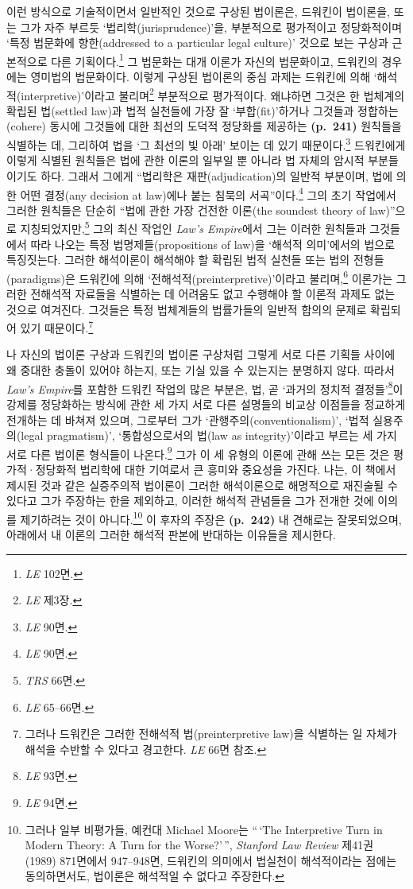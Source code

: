 이런 방식으로 기술적이면서 일반적인 것으로 구상된 법이론은, 드워킨이
법이론을, 또는 그가 자주 부르듯 ‘법리학(jurisprudence)’을, 부분적으로
평가적이고 정당화적이며 ‘특정 법문화에 향한(addressed to a particular
legal culture)’ 것으로 보는 구상과 근본적으로 다른 기획이다.\footnote{\emph{LE}
  102면.} 그 법문화는 대개 이론가 자신의 법문화이고, 드워킨의 경우에는
영미법의 법문화이다. 이렇게 구상된 법이론의 중심 과제는 드워킨에 의해
‘해석적(interpretive)’이라고 불리며\footnote{\emph{LE} 제3장.}
부분적으로 평가적이다. 왜냐하면 그것은 한 법체계의 확립된 법(settled
law)과 법적 실천들에 가장 잘 ‘부합(fit)’하거나 그것들과 정합하는(cohere)
동시에 그것들에 대한 최선의 도덕적 정당화를 제공하는 \textbf{(p.~241)}
원칙들을 식별하는 데, 그리하여 법을 ‘그 최선의 빛 아래’ 보이는 데 있기
때문이다.\footnote{\emph{LE} 90면.} 드워킨에게 이렇게 식별된 원칙들은
법에 관한 이론의 일부일 뿐 아니라 법 자체의 암시적 부분들이기도 하다.
그래서 그에게 “법리학은 재판(adjudication)의 일반적 부분이며, 법에 의한
어떤 결정(any decision at law)에나 붙는 침묵의 서곡”이다.\footnote{\emph{LE}
  90면.} 그의 초기 작업에서 그러한 원칙들은 단순히 “법에 관한 가장
건전한 이론(the soundest theory of law)”으로 지칭되었지만,\footnote{\emph{TRS}
  66면.} 그의 최신 작업인 \emph{Law's Empire}에서 그는 이러한 원칙들과
그것들에서 따라 나오는 특정 법명제들(propositions of law)을 ‘해석적
의미’에서의 법으로 특징짓는다. 그러한 해석이론이 해석해야 할 확립된 법적
실천들 또는 법의 전형들(paradigms)은 드워킨에 의해
‘전해석적(preinterpretive)’이라고 불리며,\footnote{\emph{LE} 65--66면.}
이론가는 그러한 전해석적 자료들을 식별하는 데 어려움도 없고 수행해야 할
이론적 과제도 없는 것으로 여겨진다. 그것들은 특정 법체계들의 법률가들의
일반적 합의의 문제로 확립되어 있기 때문이다.\footnote{그러나 드워킨은
  그러한 전해석적 법(preinterpretive law)을 식별하는 일 자체가 해석을
  수반할 수 있다고 경고한다. \emph{LE} 66면 참조.}

나 자신의 법이론 구상과 드워킨의 법이론 구상처럼 그렇게 서로 다른 기획들
사이에 왜 중대한 충돌이 있어야 하는지, 또는 기실 있을 수 있는지는
분명하지 않다. 따라서 \emph{Law's Empire}를 포함한 드워킨 작업의 많은
부분은, 법, 곧 ‘과거의 정치적 결정들’\footnote{\emph{LE} 93면.}이 강제를
정당화하는 방식에 관한 세 가지 서로 다른 설명들의 비교상 이점들을
정교하게 전개하는 데 바쳐져 있으며, 그로부터 그가
‘관행주의(conventionalism)’, ‘법적 실용주의(legal pragmatism)’,
‘통합성으로서의 법(law as integrity)’이라고 부르는 세 가지 서로 다른
법이론 형식들이 나온다.\footnote{\emph{LE} 94면.} 그가 이 세 유형의
이론에 관해 쓰는 모든 것은 평가적·정당화적 법리학에 대한 기여로서 큰
흥미와 중요성을 가진다. 나는, 이 책에서 제시된 것과 같은 실증주의적
법이론이 그러한 해석이론으로 해명적으로 재진술될 수 있다고 그가 주장하는
한을 제외하고, 이러한 해석적 관념들을 그가 전개한 것에 이의를 제기하려는
것이 아니다.\footnote{그러나 일부 비평가들, 예컨대 Michael Moore는
  “\,`The Interpretive Turn in Modern Theory: A Turn for the
  Worse?'\,”, \emph{Stanford Law Review} 제41권 (1989) 871면에서
  947--948면, 드워킨의 의미에서 법실천이 해석적이라는 점에는
  동의하면서도, 법이론은 해석적일 수 없다고 주장한다.} 이 후자의 주장은
\textbf{(p.~242)} 내 견해로는 잘못되었으며, 아래에서 내 이론의 그러한
해석적 판본에 반대하는 이유들을 제시한다.

